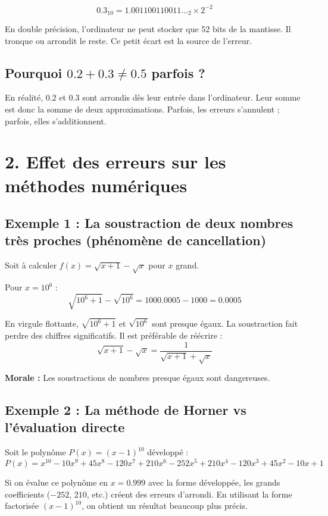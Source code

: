 \documentclass[12pt,letterpaper]{article}
\begin{document}
\[
0.3_{10} = 1.001100110011\ldots_2 \times 2^{-2}
\]

En double précision, l'ordinateur ne peut stocker que 52 bits de la mantisse. Il tronque ou arrondit le reste. Ce petit écart est la source de l'erreur.

\subsection*{Pourquoi $0.2 + 0.3 \neq 0.5$ parfois ?}
En réalité, $0.2$ et $0.3$ sont arrondis dès leur entrée dans l'ordinateur. Leur somme est donc la somme de deux approximations. Parfois, les erreurs s'annulent ; parfois, elles s'additionnent.

\section*{2. Effet des erreurs sur les méthodes numériques}

\subsection*{Exemple 1 : La soustraction de deux nombres très proches (phénomène de cancellation)}

Soit à calculer $f(x) = \sqrt{x+1} - \sqrt{x}$ pour $x$ grand.

Pour $x = 10^6$ :
\[
\sqrt{10^6 + 1} - \sqrt{10^6} = 1000.0005 - 1000 = 0.0005
\]

En virgule flottante, $\sqrt{10^6+1}$ et $\sqrt{10^6}$ sont presque égaux. La soustraction fait perdre des chiffres significatifs. Il est préférable de réécrire :
\[
\sqrt{x+1} - \sqrt{x} = \frac{1}{\sqrt{x+1} + \sqrt{x}}
\]

\textbf{Morale :} Les soustractions de nombres presque égaux sont dangereuses.

\subsection*{Exemple 2 : La méthode de Horner vs l'évaluation directe}

Soit le polynôme $P(x) = (x-1)^{10}$ développé :
\[
P(x) = x^{10} - 10x^9 + 45x^8 - 120x^7 + 210x^6 - 252x^5 + 210x^4 - 120x^3 + 45x^2 - 10x + 1
\]

Si on évalue ce polynôme en $x = 0.999$ avec la forme développée, les grands coefficients ($-252$, $210$, etc.) créent des erreurs d'arrondi. En utilisant la forme factorisée $(x-1)^{10}$, on obtient un résultat beaucoup plus précis.
\end{document}
